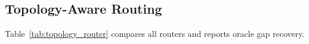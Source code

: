 \documentclass{article}
\begin{document}
\subsection{Topology-Aware Routing}
\label{sec:topology_routing}

Table~\ref{tab:topology_router} compares all routers and reports oracle gap recovery.

\end{document}
